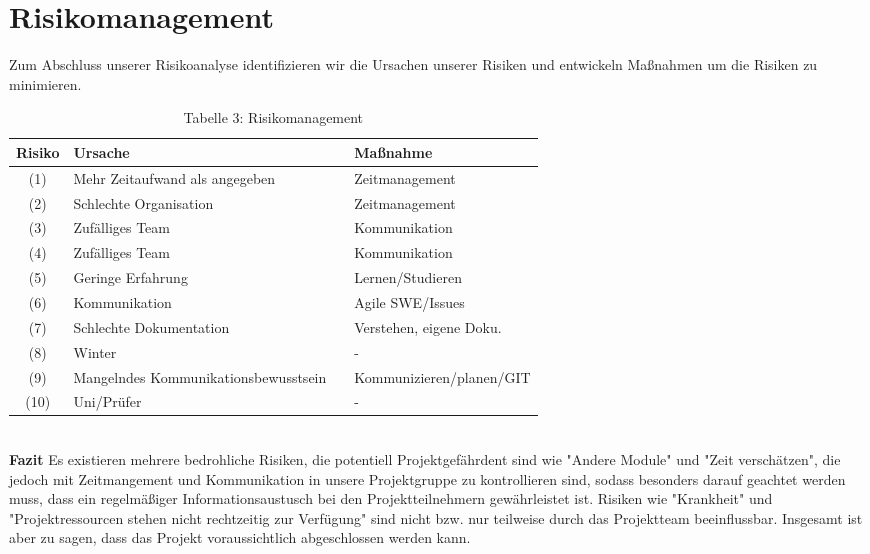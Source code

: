 \section{Risikomanagement}
Zum Abschluss unserer Risikoanalyse identifizieren wir die Ursachen unserer Risiken und entwickeln Maßnahmen um die Risiken zu minimieren.

\vspace{2em}

\begin{table}[h]
	\caption*{Tabelle 3: Risikomanagement}
	\begin{center}	
		\begin{tabularx}{\textwidth}{clXl}
			\textbf{Risiko}&\textbf{Ursache}&&\textbf{Maßnahme}\\\hline
			(1)&Mehr Zeitaufwand als angegeben&&Zeitmanagement\\
			(2)&Schlechte Organisation&&Zeitmanagement\\
			(3)&Zufälliges Team&&Kommunikation\\
			(4)&Zufälliges Team&&Kommunikation\\
			(5)&Geringe Erfahrung&&Lernen/Studieren\\
			(6)&Kommunikation&&Agile SWE/Issues\\
			(7)&Schlechte Dokumentation&&Verstehen, eigene Doku.\\
			(8)&Winter&&-\\
			(9)&Mangelndes Kommunikationsbewusstsein&&Kommunizieren/planen/GIT\\
			(10)&Uni/Prüfer&&-\\\hline
		\end{tabularx}
	\end{center}
\end{table}

\ \\
\textbf{Fazit}
Es existieren mehrere bedrohliche Risiken, die potentiell Projektgefährdent sind wie "Andere Module" und "Zeit verschätzen", die jedoch mit Zeitmangement und Kommunikation in unsere Projektgruppe zu kontrollieren sind, sodass besonders darauf geachtet werden muss, dass ein regelmäßiger Informationsaustusch bei den Projektteilnehmern gewährleistet ist. Risiken wie "Krankheit" und "Projektressourcen stehen nicht rechtzeitig zur Verfügung" sind nicht bzw. nur teilweise durch das Projektteam beeinflussbar. Insgesamt ist aber zu sagen, dass das Projekt voraussichtlich abgeschlossen werden kann.


